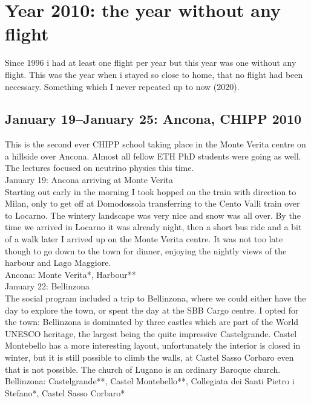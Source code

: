 \chapter{Year 2010: the year without any flight}
\label{2010}

Since 1996 i had at least one flight per year but this year was one without any flight. This was the year when i stayed so close to home, that no flight had been necessary. Something which I never repeated up to now (2020).

\section{January 19--January 25: Ancona, CHIPP 2010}
\label{Ancona2010}

This is the second ever CHIPP school taking place in the Monte Verita centre on a hillside over Ancona. Almost all fellow ETH PhD students were going as well. The lectures focused on neutrino physics this time.\\

January 19: Ancona arriving at Monte Verita\\
Starting out early in the morning I took hopped on the train with direction to Milan, only to get off at Domodossola transferring to the Cento Valli train over to Locarno. The wintery landscape was very nice and snow was all over. By the time we arrived in Locarno it was already night, then a short bus ride and a bit of a walk later I arrived up on the Monte Verita centre. It was not too late though to go down to the town for dinner, enjoying the nightly views of the harbour and Lago Maggiore.\\

Ancona: Monte Verita*, Harbour**\\

January 22: Bellinzona\\
The social program included a trip to Bellinzona, where we could either have the day to explore the town, or spent the day at the SBB Cargo centre. I opted for the town: Bellinzona is dominated by three castles which are part of the World UNESCO heritage, the largest being the quite impressive Castelgrande. Castel Montebello has a more interesting layout, unfortunately the interior is closed in winter, but it is still possible to climb the walls, at Castel Sasso Corbaro even that is not possible. The church of Lugano is an ordinary Baroque church.\\

Bellinzona: Castelgrande**, Castel Montebello**, Collegiata dei Santi Pietro i Stefano*, Castel Sasso Corbaro*\\

